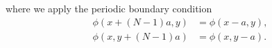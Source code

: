 %
where we apply the periodic boundary condition
%
\begin{align}
    \phi(x + (N-1)a, y) & = \phi(x - a, y), \\
    \phi(x, y + (N-1)a) & = \phi(x, y - a).
\end{align}

